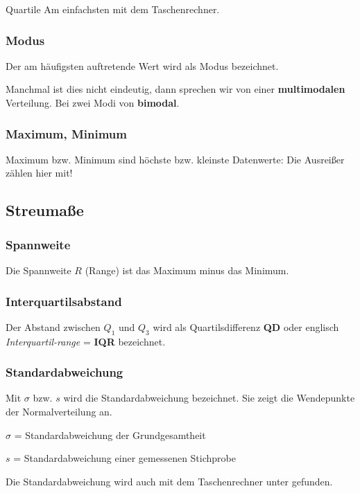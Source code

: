 \begin{multicols}{2}
\begin{rezept*}{Quartile}{}
Am einfachsten mit dem Taschenrechner.
\end{rezept*}

\subsubsection*{Modus}
Der am häufigsten auftretende Wert wird als Modus bezeichnet.

Manchmal ist dies nicht eindeutig, dann sprechen wir von einer
\textbf{multimodalen} Verteilung. Bei zwei Modi von \textbf{bimodal}.

\subsubsection*{Maximum, Minimum}
Maximum bzw. Minimum sind höchste bzw. kleinste Datenwerte: Die Ausreißer
zählen hier mit!

\subsection*{Streumaße}
\subsubsection*{Spannweite}
Die Spannweite $R$ (Range) ist das Maximum minus
das Minimum.

\subsubsection*{Interquartilsabstand}
Der Abstand zwischen $Q_1$ und $Q_3$ wird als
Quartilsdifferenz \textbf{QD} oder
englisch \textit{Interquartil-range} = \textbf{IQR} bezeichnet.

\subsubsection*{Standardabweichung}
Mit $\sigma$ bzw. $s$ wird die Standardabweichung bezeichnet. Sie
zeigt die Wendepunkte der Normalverteilung an.

$\sigma$ = Standardabweichung der Grundgesamtheit

$s$ = Standardabweichung einer gemessenen Stichprobe 

Die Standardabweichung wird auch mit dem Taschenrechner
unter  gefunden.


\end{multicols}
